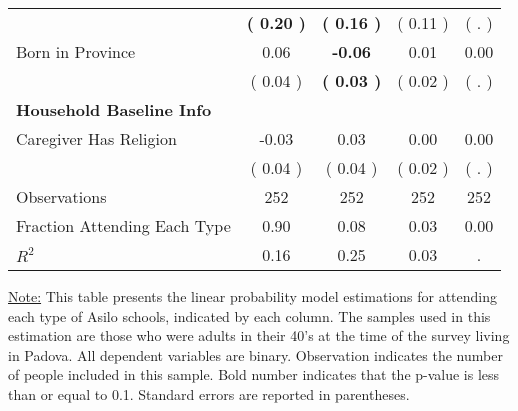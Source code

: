 \begin{table}[H]
{\begin{tabular}{lcccc}
\quad  & \textbf{(     0.20 )} & \textbf{(     0.16 )}  & (     0.11 )  & (        . )  \\
\quad Born in Province &      0.06 & \textbf{    -0.06} &      0.01 &      0.00 \\
\quad  & (     0.04 ) & \textbf{(     0.03 )}  & (     0.02 )  & (        . )  \\
\midrule
\textbf{Household Baseline Info} \\
\quad Caregiver Has Religion &     -0.03 &      0.03 &      0.00 &      0.00 \\
\quad  & (     0.04 ) & (     0.04 )  & (     0.02 )  & (        . )  \\
\midrule
Observations & 252 & 252 & 252 & 252 \\
Fraction Attending Each Type &      0.90 &      0.08 &      0.03 &      0.00 \\
\midrule
$ R^2$ &      0.16 &      0.25 &      0.03 &         . \\
\bottomrule
\end{tabular}}
\end{table}
\begin{scriptsize}
\noindent\underline{Note:} This table presents the linear probability model estimations for attending each type of Asilo schools, indicated by each column. The samples used in this estimation are those who were adults in their 40's at the time of the survey living in Padova. All dependent variables are binary. Observation indicates the number of people included in this sample. Bold number indicates that the p-value is less than or equal to 0.1. Standard errors are reported in parentheses.
\end{scriptsize}
